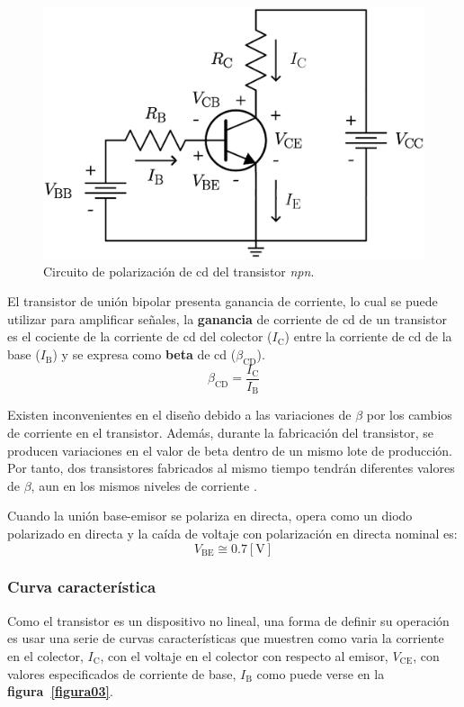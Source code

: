\begin{figure}[!ht]
\centering
\includegraphics[scale=0.30]{diagramas/figura02.eps}
\caption{Circuito de polarización de cd del transistor \emph{npn}.}
\label{figura02}
\end{figure}

El transistor de unión bipolar presenta ganancia de corriente, lo cual se puede
utilizar para amplificar señales, la \textbf{ganancia} de corriente de cd de un
transistor es el cociente de la corriente de cd del colector ($I_{\text{C}}$)
entre la corriente de cd de la base ($I_{\text{B}}$) y se expresa como
\textbf{beta} de cd ($\beta_{\text{CD}}$).
\begin{equation*}
    \beta_{\text{CD}} = \frac{I_{\text{C}}}{I_{\text{B}}}
\end{equation*}

Existen inconvenientes en el diseño debido a las variaciones de $\beta$ por los
cambios de corriente en el transistor. Además, durante la fabricación del
transistor, se producen variaciones en el valor de beta dentro de un mismo lote
de producción. Por tanto, dos transistores fabricados al mismo tiempo tendrán
diferentes valores de $\beta$, aun en los mismos niveles de corriente
\cite{Savant}.

Cuando la unión base-emisor se polariza en directa, opera como un diodo
polarizado en directa y la caída de voltaje con polarización en directa nominal
es:
\begin{equation*}
    V_{\text{BE}} \cong 0.7 [\text{V}]
\end{equation*}

\subsubsection{Curva característica}
Como el transistor es un dispositivo no lineal, una forma de definir su
operación es usar una serie de curvas características que muestren como varia la
corriente en el colector, $I_{\text{C}}$, con el voltaje en el colector con
respecto al emisor, $V_{\text{CE}}$, con valores especificados de corriente de
base, $I_{\text{B}}$ como puede verse en la \textbf{figura~\ref{figura03}}.

